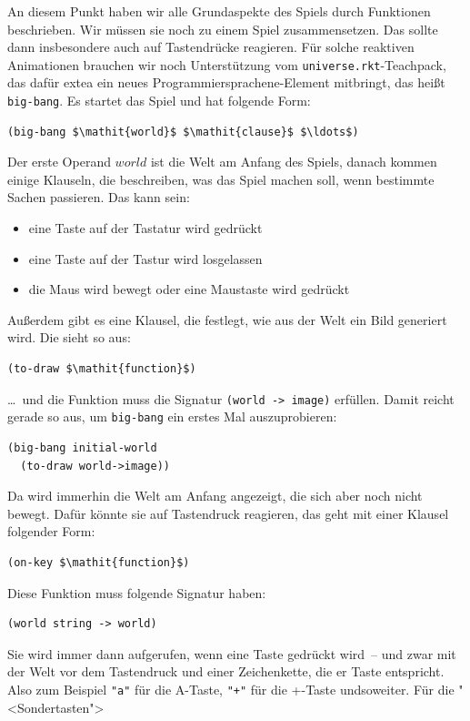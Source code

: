 An diesem Punkt haben wir alle Grundaspekte des Spiels durch
Funktionen beschrieben.  Wir müssen sie noch zu einem Spiel
zusammensetzen.  Das sollte dann insbesondere auch auf Tastendrücke
reagieren.  Für solche reaktiven Animationen brauchen wir noch
Unterstützung vom \texttt{universe.rkt}-Teachpack, das dafür extea ein
neues Programmiersprachene-Element mitbringt, das heißt
\lstinline{big-bang}.  Es startet
das Spiel und hat folgende Form:
%
\begin{lstlisting}
(big-bang $\mathit{world}$ $\mathit{clause}$ $\ldots$)
\end{lstlisting}
%
Der erste Operand $world$ ist die Welt am Anfang des Spiels, danach
kommen einige Klauseln, die beschreiben, was das Spiel machen soll,
wenn bestimmte Sachen passieren.  Das kann sein:
%
\begin{itemize}
\item eine Taste auf der Tastatur wird gedrückt
\item eine Taste auf der Tastur wird losgelassen
\item die Maus wird bewegt oder eine Maustaste wird gedrückt
\end{itemize}
%
Außerdem gibt es eine Klausel, die festlegt, wie aus der Welt ein Bild
generiert wird.  Die sieht so aus:
%
\begin{lstlisting}
(to-draw $\mathit{function}$)
\end{lstlisting}
%
\ldots~und die Funktion muss die Signatur \lstinline{(world -> image)}
erfüllen.  Damit reicht gerade so aus, um \lstinline{big-bang} ein
erstes Mal auszuprobieren:
%
\begin{lstlisting}
(big-bang initial-world
  (to-draw world->image))
\end{lstlisting}
%
Da wird immerhin die Welt am Anfang angezeigt, die sich aber noch
nicht bewegt.  Dafür könnte sie auf Tastendruck reagieren, das geht
mit einer Klausel folgender Form:
%
\begin{lstlisting}
(on-key $\mathit{function}$)
\end{lstlisting}
%
Diese Funktion muss folgende Signatur haben:
%
\begin{lstlisting}
(world string -> world)
\end{lstlisting}
%
Sie wird immer dann aufgerufen, wenn eine Taste gedrückt wird~-- und
zwar mit der Welt vor dem Tastendruck und einer Zeichenkette, die er
Taste entspricht.  Also zum Beispiel \lstinline{"a"} für die A-Taste,
\lstinline{"+"} für die +-Taste undsoweiter.  Für die "<Sondertasten">
